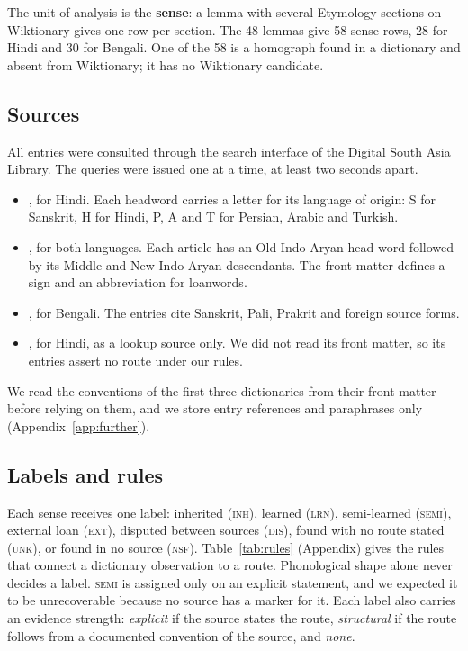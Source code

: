 \documentclass[11pt]{article}
\newcommand{\lbl}[1]{\textsc{#1}}
\begin{document}
The unit of analysis is the \textbf{sense}: a lemma with several Etymology sections on Wiktionary gives one row per section. The 48 lemmas give 58 sense rows, 28 for Hindi and 30 for Bengali. One of the 58 is a homograph found in a dictionary and absent from Wiktionary; it has no Wiktionary candidate.

\subsection{Sources}

All entries were consulted through the search interface of the Digital South Asia Library. The queries were issued one at a time, at least two seconds apart.
\begin{itemize}
\item \textbf{\citet{platts1884}}, for Hindi. Each headword carries a letter for its language of origin: S for Sanskrit, H for Hindi, P, A and T for Persian, Arabic and Turkish.
\item \textbf{\citet{turner1966cdial}}, for both languages. Each article has an Old Indo-Aryan head-word followed by its Middle and New Indo-Aryan descendants. The front matter defines a sign and an abbreviation for loanwords.
\item \textbf{\citet{dasa1937bangala}}, for Bengali. The entries cite Sanskrit, Pali, Prakrit and foreign source forms.
\item \textbf{\citet{dasa1975sabdasagara}}, for Hindi, as a lookup source only. We did not read its front matter, so its entries assert no route under our rules.
\end{itemize}
We read the conventions of the first three dictionaries from their front matter before relying on them, and we store entry references and paraphrases only (Appendix~\ref{app:further}).

\subsection{Labels and rules}

Each sense receives one label: inherited (\lbl{inh}), learned (\lbl{lrn}), semi-learned (\lbl{semi}), external loan (\lbl{ext}), disputed between sources (\lbl{dis}), found with no route stated (\lbl{unk}), or found in no source (\lbl{nsf}). Table~\ref{tab:rules} (Appendix) gives the rules that connect a dictionary observation to a route. Phonological shape alone never decides a label. \lbl{semi} is assigned only on an explicit statement, and we expected it to be unrecoverable because no source has a marker for it. Each label also carries an evidence strength: \textit{explicit} if the source states the route, \textit{structural} if the route follows from a documented convention of the source, and \textit{none}.
\end{document}
